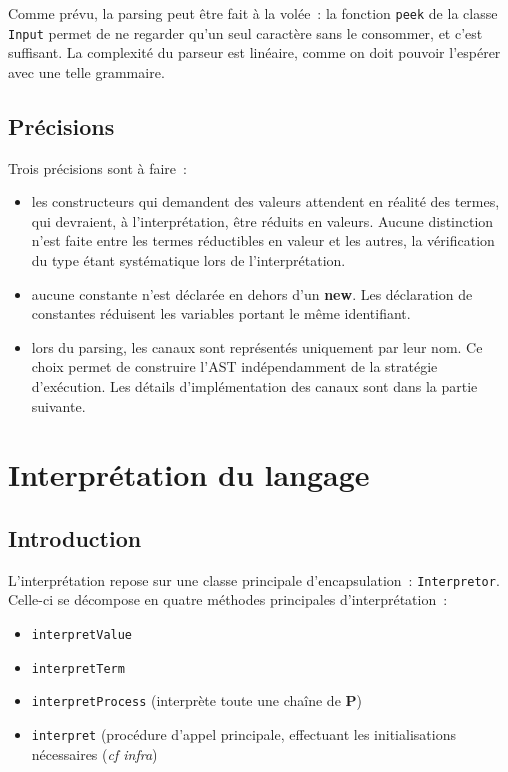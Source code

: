 \documentclass[11pt]{article} %
\begin{document}
Comme prévu, la parsing peut être fait à la volée~: la fonction \texttt{peek} de la classe \texttt{Input} permet de ne regarder qu'un seul caractère sans le consommer, et c'est suffisant. La complexité du parseur est linéaire, comme on doit pouvoir l'espérer avec une telle grammaire.

\subsection{Précisions}

Trois précisions sont à faire~:
\begin{itemize}
\item les constructeurs qui demandent des valeurs attendent en réalité des termes, qui devraient, à l'interprétation, être réduits en valeurs. Aucune distinction n'est faite entre les termes réductibles en valeur et les autres, la vérification du type étant systématique lors de l'interprétation.
\item aucune constante n'est déclarée en dehors d'un \textbf{new}. Les déclaration de constantes réduisent les variables portant le même identifiant.
\item lors du parsing, les canaux sont représentés uniquement par leur nom. Ce choix permet de construire l'AST indépendamment de la stratégie d'exécution. Les détails d'implémentation des canaux sont dans la partie suivante.
\end{itemize}

\section{Interprétation du langage}

\subsection{Introduction}

  L'interprétation repose sur une classe principale d'encapsulation~: \texttt{Interpretor}.  Celle-ci se décompose en quatre méthodes principales d'interprétation~:
\begin{itemize}
  \item \texttt{interpretValue}
  \item \texttt{interpretTerm}
  \item \texttt{interpretProcess} (interprète toute une chaîne de \textbf{P})
  \item \texttt{interpret} (procédure d'appel principale, effectuant les initialisations nécessaires (\emph{cf infra})
\end{itemize}
\end{document}
